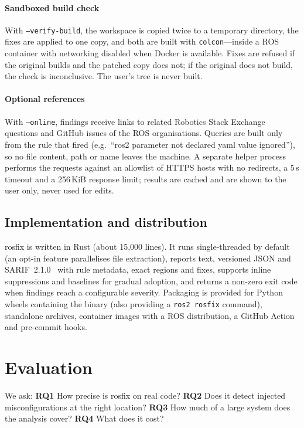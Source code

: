 ﻿\documentclass[conference]{IEEEtran}
\newcommand{\tool}{\textsf{rosfix}}
\newcommand{\code}[1]{\texttt{#1}}
\begin{document}
\paragraph{Sandboxed build check}
With \code{--verify-build}, the workspace is copied twice to a temporary directory, the fixes are
applied to one copy, and both are built with \code{colcon}---inside a ROS container with
networking disabled when Docker is available. Fixes are refused if the original builds and the
patched copy does not; if the original does not build, the check is inconclusive. The user's
tree is never built.

\paragraph{Optional references}
With \code{--online}, findings receive links to related Robotics Stack Exchange questions and
GitHub issues of the ROS organisations. Queries are built only from the rule that fired
(e.g.\ ``ros2 parameter not declared yaml value ignored''), so no file content, path or name
leaves the machine. A separate helper process performs the requests against an allowlist of
HTTPS hosts with no redirects, a 5\,s timeout and a 256\,KiB response limit; results are cached
and are shown to the user only, never used for edits.

\subsection{Implementation and distribution}

\tool{} is written in Rust (about 15{,}000 lines). It runs single-threaded by default (an
opt-in feature parallelises file extraction), reports text, versioned JSON and
SARIF~2.1.0~\cite{sarif} with rule metadata, exact regions and fixes, supports inline
suppressions and baselines for gradual adoption, and returns a non-zero exit code when findings
reach a configurable severity. Packaging is provided for Python wheels containing the binary
(also providing a \code{ros2 rosfix} command), standalone archives, container images with a ROS
distribution, a GitHub Action and pre-commit hooks.

\section{Evaluation}
\label{sec:eval}

We ask: \textbf{RQ1} How precise is \tool{} on real code? \textbf{RQ2} Does it detect injected
misconfigurations at the right location? \textbf{RQ3} How much of a large system does the
analysis cover? \textbf{RQ4} What does it cost?
\end{document}
